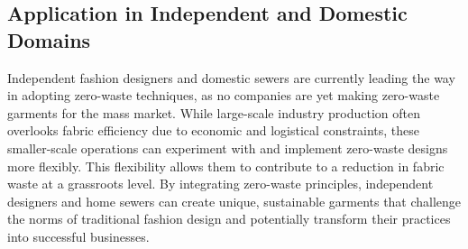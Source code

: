 \subsection{Application in Independent and Domestic Domains}
Independent fashion designers and domestic sewers are currently leading the way in adopting zero-waste techniques, as no companies are yet making zero-waste garments for the mass market. While large-scale industry production often overlooks fabric efficiency due to economic and logistical constraints, these smaller-scale operations can experiment with and implement zero-waste designs more flexibly. This flexibility allows them to contribute to a reduction in fabric waste at a grassroots level. By integrating zero-waste principles, independent designers and home sewers can create unique, sustainable garments that challenge the norms of traditional fashion design and potentially transform their practices into successful businesses. 

